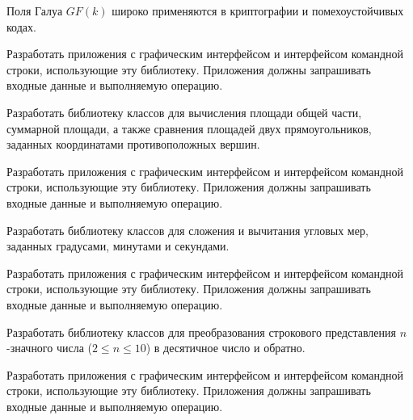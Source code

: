 Поля Галуа $GF(k)$ широко применяются в криптографии и
помехоустойчивых кодах.

Разработать приложения с графическим интерфейсом и интерфейсом
командной строки, использующие эту библиотеку. Приложения должны
запрашивать входные данные и выполняемую операцию.

\task Разработать библиотеку классов для вычисления площади общей
части, суммарной площади, а также сравнения площадей двух
прямоугольников, заданных координатами противоположных вершин.

Разработать приложения с графическим интерфейсом и интерфейсом
командной строки, использующие эту библиотеку. Приложения должны
запрашивать входные данные и выполняемую операцию.

\task Разработать библиотеку классов для сложения и вычитания угловых
мер, заданных градусами, минутами и секундами.

Разработать приложения с графическим интерфейсом и интерфейсом
командной строки, использующие эту библиотеку. Приложения должны
запрашивать входные данные и выполняемую операцию.

\task Разработать библиотеку классов для преобразования строкового
представления $n$-значного числа ($2\leqslant n \leqslant 10$) в
десятичное число и обратно.

Разработать приложения с графическим интерфейсом и интерфейсом
командной строки, использующие эту библиотеку. Приложения должны
запрашивать входные данные и выполняемую операцию.